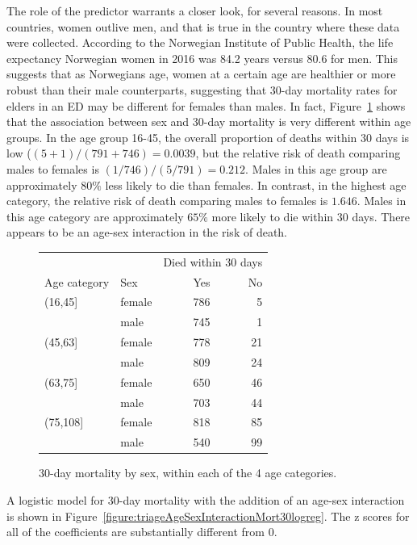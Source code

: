 The role of the predictor  warrants a closer look, for several reasons.  In most countries, women outlive men, and that is true in the country where these data were collected.  According to the Norwegian Institute of Public Health,  the life expectancy Norwegian women in 2016 was 84.2 years versus 80.6 for men.  This suggests that as Norwegians age, women at a certain age are healthier or more robust than their male counterparts, suggesting that 30-day mortality rates for elders in an ED may be different for females than males.  In fact, Figure~\ref{figure:mort30SexWithinAgeGroupTable} shows that the association between sex and 30-day mortality is very different within age groups.  In the age group 16-45, the overall proportion of deaths within 30 days is low ($(5 + 1)/(791 + 746) = 0.0039$, but the relative risk of death comparing males to females is $(1/746)/(5/791) = 0.212$.  Males in this age group are approximately $80\%$ less likely to die than females.  In contrast, in the highest age category, the relative risk of death comparing males to females is $1.646$.  Males in this age category are approximately $65\%$ more likely to die within 30 days.  There appears to be an age-sex interaction in the risk of death.  

\begin{figure}[ht]
\centering
\begin{tabular}{llrr}
  \hline
    & & \multicolumn{2}{c}{Died within 30 days}   \\
Age category & Sex & Yes & No \\
\hline
(16,45] & female  &    786 &  5 \\
        & male    &    745 &  1 \\
(45,63] & female  &    778 & 21 \\
        & male    &    809 & 24 \\
(63,75] & female  &    650 & 46 \\
        & male    &    703 &  44 \\
(75,108] & female &     818 & 85 \\
         & male   &     540 & 99 \\
\hline
\end{tabular}
\caption{30-day mortality by sex, within each of the 4 age categories.}
\label{figure:mort30SexWithinAgeGroupTable}
\end{figure}

A logistic model for 30-day mortality with the addition of an age-sex interaction is shown in Figure~\ref{figure:triageAgeSexInteractionMort30logreg}.  The z scores for all of the coefficients are substantially different from 0.


